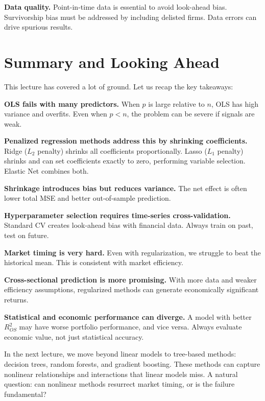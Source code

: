 \documentclass[11pt,a4paper]{article}
\begin{document}
\textbf{Data quality.} Point-in-time data is essential to avoid look-ahead bias. Survivorship bias must be addressed by including delisted firms. Data errors can drive spurious results.

\section{Summary and Looking Ahead}

This lecture has covered a lot of ground. Let us recap the key takeaways:

\textbf{OLS fails with many predictors.} When $p$ is large relative to $n$, OLS has high variance and overfits. Even when $p < n$, the problem can be severe if signals are weak.

\textbf{Penalized regression methods address this by shrinking coefficients.} Ridge ($L_2$ penalty) shrinks all coefficients proportionally. Lasso ($L_1$ penalty) shrinks and can set coefficients exactly to zero, performing variable selection. Elastic Net combines both.

\textbf{Shrinkage introduces bias but reduces variance.} The net effect is often lower total MSE and better out-of-sample prediction.

\textbf{Hyperparameter selection requires time-series cross-validation.} Standard CV creates look-ahead bias with financial data. Always train on past, test on future.

\textbf{Market timing is very hard.} Even with regularization, we struggle to beat the historical mean. This is consistent with market efficiency.

\textbf{Cross-sectional prediction is more promising.} With more data and weaker efficiency assumptions, regularized methods can generate economically significant returns.

\textbf{Statistical and economic performance can diverge.} A model with better $R^2_{OS}$ may have worse portfolio performance, and vice versa. Always evaluate economic value, not just statistical accuracy.

In the next lecture, we move beyond linear models to tree-based methods: decision trees, random forests, and gradient boosting. These methods can capture nonlinear relationships and interactions that linear models miss. A natural question: can nonlinear methods resurrect market timing, or is the failure fundamental?
\end{document}
